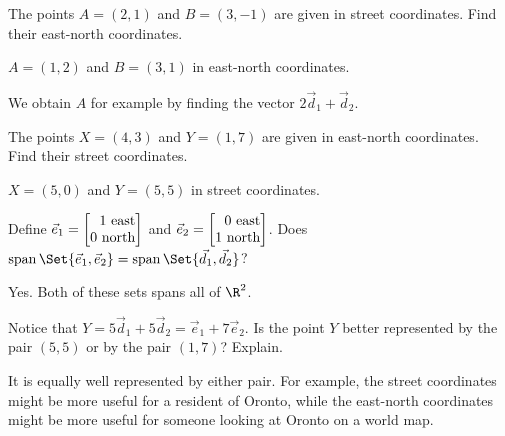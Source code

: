 	\begin{parts}
		\item The points $A=(2,1)$ and $B=(3,-1)$ are given in street coordinates.
			Find their east-north coordinates.
			\begin{solution}
				$A=(1,2)$ and $B=(3,1)$ in east-north coordinates.

				We obtain $A$ for example by finding the vector $2\vec d_1+\vec d_2$.
			\end{solution}
		\item The points $X=(4,3)$ and $Y=(1,7)$ are given in east-north coordinates.
			Find their street coordinates.
			\begin{solution}[inline]
				$X=(5,0)$ and $Y=(5,5)$ in street coordinates.
			\end{solution}
		\item Define $\vec e_1=\mat{1\text{ east}\\0\text{ north}}$ and
			$\vec e_2=\mat{0\text{ east}\\1\text{ north}}$.
			Does $\Span\Set{\vec e_1,\vec e_2} = \Span\Set{\vec d_1,\vec d_2}$?
			\begin{solution}
				Yes. Both of these sets spans all of $\R^2$.
			\end{solution}
		\item Notice that $Y=5\vec d_1+5\vec d_2 = \vec e_1+7\vec e_2$. Is the point $Y$
			better represented by the pair $(5,5)$ or by the pair $(1,7)$? Explain.
			\begin{solution}
				It is equally well represented by either pair. For example, the
				street coordinates might be more useful for a resident of Oronto,
				while the east-north coordinates might be more useful for someone
				looking at Oronto on a world map.
			\end{solution}
	\end{parts}

\displayonlynewpage
	\bookonlynewpage

